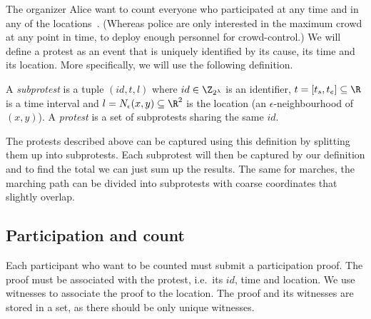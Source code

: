 
The organizer Alice want to count everyone who participated at any time and in 
any of the locations~\cite{2016DemonstrationsInSeoul}.
(Whereas police are only interested in the maximum crowd at any point in time, 
to deploy enough personnel for crowd-control.)
We will define a protest as an event that is uniquely identified by its cause, 
its time and its location.
More specifically, we will use the following definition.

\begin{frame}
\begin{definition}[Protest]\label{DefProtest}
  A \emph{subprotest} is a tuple \((id, t, l)\) where
  \(id\in \Z_{2^\lambda}\) is an identifier,
  \(t = \interval{t_s}{t_e}\subseteq \R\) is a time interval and
  \(l = N_\epsilon(x, y)\subseteq \R^2\) is the location (an 
  \(\epsilon\)-neighbourhood of \((x,y)\)).
  A \emph{protest} is a set of subprotests sharing the same \(id\).
\end{definition}
\end{frame}

The protests described above can be captured using this definition by splitting 
them up into subprotests.
Each subprotest will then be captured by our definition and to find the total 
we can just sum up the results.
The same for marches, the marching path can be divided into subprotests with 
coarse coordinates that slightly overlap.

\subsection{Participation and count}

Each participant who want to be counted must submit a participation proof.
The proof must be associated with the protest, i.e.\ its \(id\), time and 
location.
We use witnesses to associate the proof to the location.
The proof and its witnesses are stored in a set, as there should be only unique 
witnesses.

